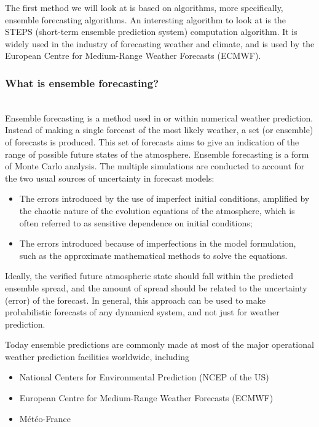 \documentclass[../paper.tex]{subfiles}
\begin{document}
    The first method we will look at is based on algorithms, more specifically, ensemble forecasting algorithms.
    An interesting algorithm to look at is the STEPS (short-term ensemble prediction system) computation algorithm.
    It is widely used in the industry of forecasting weather and climate, and is used by the European Centre for Medium-Range Weather Forecasts (ECMWF)\cite{a1, b4}. \\
    \subsubsection{What is ensemble forecasting?}
        \hfill\\
        Ensemble forecasting is a method used in or within numerical weather prediction.
        Instead of making a single forecast of the most likely weather, a set (or ensemble) of forecasts is produced.
        This set of forecasts aims to give an indication of the range of possible future states of the atmosphere.
        Ensemble forecasting is a form of Monte Carlo analysis.
        The multiple simulations are conducted to account for the two usual sources of uncertainty in forecast models:
        \begin{itemize}
            \item The errors introduced by the use of imperfect initial conditions, amplified by the chaotic nature of the evolution equations of the atmosphere, which is often referred to as sensitive dependence on initial conditions;
            \item The errors introduced because of imperfections in the model formulation, such as the approximate mathematical methods to solve the equations.
        \end{itemize}
        Ideally, the verified future atmospheric state should fall within the predicted ensemble spread,
        and the amount of spread should be related to the uncertainty (error) of the forecast.
        In general, this approach can be used to make probabilistic forecasts of any dynamical system,
        and not just for weather prediction\cite{a1}.

        Today ensemble predictions are commonly made at most of the major operational weather prediction facilities worldwide,
        including
        \begin{itemize}
            \item National Centers for Environmental Prediction (NCEP of the US)
            \item European Centre for Medium-Range Weather Forecasts (ECMWF)
            \item M\'et\'eo-France
        \end{itemize}\cite{a1}
\end{document}

